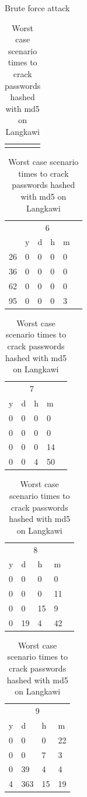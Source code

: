 \documentclass[12pt,aspectratio=169]{beamer}
\begin{document}
\begin{frame}{Brute force attack}
	\begin{table}
		\begin{tabular}{p{10.5cm}}
			\toprule
			\centering{Password length}
		\end{tabular}
		\begin{tabular}{@{} l p{1.2mm}p{1.2mm}p{1.2mm}p{1.2mm} p{0.1mm}}
			   & \multicolumn{4}{c}{6} & \\
			   & y & d & h & m & \\\midrule
			26 & 0 & 0 & 0 & 0 & \\
			36 & 0 & 0 & 0 & 0 & \\
			62 & 0 & 0 & 0 & 0 & \\
			95 & 0 & 0 & 0 & 3 & \\\bottomrule
		\end{tabular}%
		\begin{tabular}{p{1.2mm}p{1.2mm}p{1.2mm}p{1.2mm} p{0.1mm}}
			\multicolumn{4}{c}{7} & \\
			y & d & h & m & \\\midrule
			0 & 0 & 0 & 0 & \\
			0 & 0 & 0 & 0 & \\
			0 & 0 & 0 & 14 & \\
			0 & 0 & 4 & 50 & \\\bottomrule
		\end{tabular}%
		\begin{tabular}{p{1.2mm}p{1.2mm}p{1.2mm}p{1.2mm} p{0.1mm}}
			\multicolumn{4}{c}{8} & \\
			y & d & h & m & \\\midrule
			0 & 0 & 0 & 0 & \\
			0 & 0 & 0 & 11 & \\
			0 & 0 & 15 & 9 & \\
			0 & 19 & 4 & 42 & \\\bottomrule
		\end{tabular}%
		\begin{tabular}{p{1.2mm}p{3mm}p{2mm}p{2mm}}
			\multicolumn{4}{c}{9} \\
			y & d & h & m \\\midrule
			0 & 0 & 0 & 22 \\
			0 & 0 & 7 & 3 \\
			0 & 39 & 4 & 4 \\
			4 & 363 & 15 & 19 \\\bottomrule
		\end{tabular}
		\caption{Worst case scenario times to crack passwords hashed with md5 on Langkawi}
	\end{table}
\end{frame}
\end{document}
